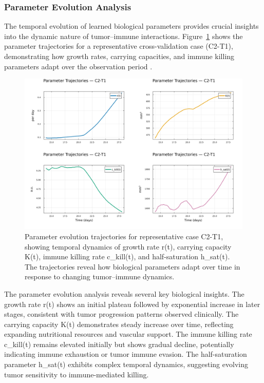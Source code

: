 \documentclass{juliacon}
\begin{document}
\subsubsection{Parameter Evolution Analysis}

The temporal evolution of learned biological parameters provides crucial insights into the dynamic nature of tumor--immune interactions. Figure~\ref{fig:param_trajectories} shows the parameter trajectories for a representative cross-validation case (C2-T1), demonstrating how growth rates, carrying capacities, and immune killing parameters adapt over the observation period \cite{dandekar2020machine,lai2021structural}.

\begin{figure}[H]\centering
\includegraphics[width=\linewidth]{parameter_trajectories_history.png}
\caption{Parameter evolution trajectories for representative case C2-T1, showing temporal dynamics of growth rate r(t), carrying capacity K(t), immune killing rate c\_kill(t), and half-saturation h\_sat(t). The trajectories reveal how biological parameters adapt over time in response to changing tumor--immune dynamics.}
\label{fig:param_trajectories}
\end{figure}

The parameter evolution analysis reveals several key biological insights. The growth rate r(t) shows an initial plateau followed by exponential increase in later stages, consistent with tumor progression patterns observed clinically. The carrying capacity K(t) demonstrates steady increase over time, reflecting expanding nutritional resources and vascular support. The immune killing rate c\_kill(t) remains elevated initially but shows gradual decline, potentially indicating immune exhaustion or tumor immune evasion. The half-saturation parameter h\_sat(t) exhibits complex temporal dynamics, suggesting evolving tumor sensitivity to immune-mediated killing.
\end{document}
